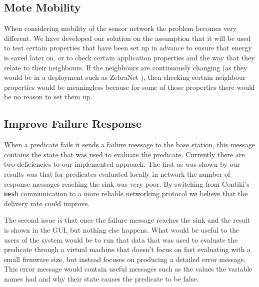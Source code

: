 \subsection{Mote Mobility}

When considering mobility of the sensor network the problem becomes very different. We have developed our solution on the assumption that it will be used to test certain properties that have been set up in advance to ensure that energy is saved later on, or to check certain application properties and the way that they relate to their neighbours. If the neighbours are continuously changing (as they would be in a deployment such as ZebraNet \cite{Juang:2002:ECW:635508.605408}), then checking certain neighbour properties would be meaningless because for some of those properties there would be no reason to set them up.

\subsection{Improve Failure Response}

When a predicate fails it sends a failure message to the base station, this message contains the state that was used to evaluate the predicate. Currently there are two deficiencies to our implemented approach. The first as was shown by our results was that for predicates evaluated locally in-network the number of response messages reaching the sink was very poor. By switching from Contiki's \verb|mesh| communication to a more reliable networking protocol we believe that the delivery rate could improve.

The second issue is that once the failure message reaches the sink and the result is shown in the GUI, but nothing else happens. What would be useful to the users of the system would be to run that data that was used to evaluate the predicate through a virtual machine that doesn't focus on fast evaluating with a small firmware size, but instead focuses on producing a detailed error message. This error message would contain useful messages such as the values the variable names had and why their state causes the predicate to be false.

